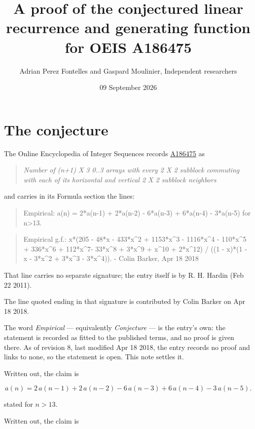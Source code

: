 \documentclass[11pt]{article}
\title{A proof of the conjectured linear recurrence and generating function for OEIS A186475}
\author{Adrian Perez Fontelles and Gaspard Moulinier, Independent researchers}
\date{09 September 2026}
\theoremstyle{definition}
\begin{document}
\maketitle
\section{The conjecture}

The Online Encyclopedia of Integer Sequences records \href{https://oeis.org/A186475}{A186475} as

\begin{quote}\itshape Number of (n+1) X 3 0..3 arrays with every 2 X 2 subblock commuting with each of its horizontal and vertical 2 X 2 subblock neighbors\end{quote}

and carries in its Formula section the lines:

\begin{quote}\ttfamily Empirical: a(n) = 2*a(n-1) + 2*a(n-2) - 6*a(n-3) + 6*a(n-4) - 3*a(n-5) for n>13.\end{quote}

\begin{quote}\ttfamily Empirical g.f.: x*(205 - 48*x - 433*x\textasciicircum{}2 + 1153*x\textasciicircum{}3 - 1116*x\textasciicircum{}4 - 110*x\textasciicircum{}5 + 336*x\textasciicircum{}6 + 112*x\textasciicircum{}7- 33*x\textasciicircum{}8 + 3*x\textasciicircum{}9 + x\textasciicircum{}10 + 2*x\textasciicircum{}12) / ((1 - x)*(1 - x - 3*x\textasciicircum{}2 + 3*x\textasciicircum{}3 - 3*x\textasciicircum{}4)). - Colin Barker, Apr 18 2018\end{quote}

That line carries no separate signature; the entry itself is by R. H. Hardin (Feb 22 2011).

The line quoted ending in that signature is contributed by Colin Barker on Apr 18 2018.

The word {\itshape Empirical} --- equivalently {\itshape Conjecture} --- is the entry's own: the statement is recorded as fitted to the published terms, and no proof is given there. As of revision 8, last modified Apr 18 2018, the entry records no proof and links to none, so the statement is open. This note settles it.

Written out, the claim is

\[a(n) = 2\,a(n-1) + 2\,a(n-2) - 6\,a(n-3) + 6\,a(n-4) - 3\,a(n-5).\]

stated for $n > 13$.

Written out, the claim is
\end{document}
